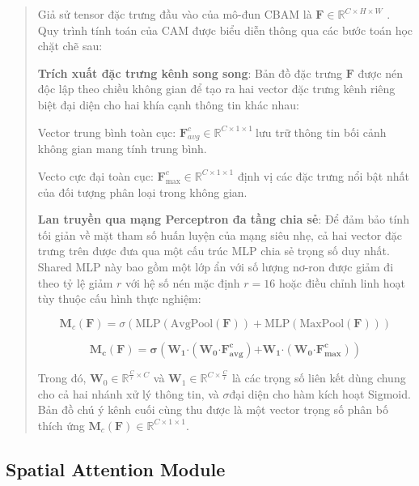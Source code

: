 \documentclass[
  12pt,
  a4paper,
]{report}
\begin{document}
\begin{quote}
Giả sử tensor đặc trưng đầu vào của mô-đun CBAM là
\(\mathbf{F} \in \mathbb{R}^{C \times H \times W}\) . Quy trình tính
toán của CAM được biểu diễn thông qua các bước toán học chặt chẽ sau:

\textbf{Trích xuất đặc trưng kênh song song}: Bản đồ đặc trưng
\(\mathbf{F}\) được nén độc lập theo chiều không gian để tạo ra hai
vector đặc trưng kênh riêng biệt đại diện cho hai khía cạnh thông tin
khác nhau:

Vector trung bình toàn cục:
\(\mathbf{F}_{avg}^{c} \in \mathbb{R}^{C \times 1 \times 1}\ \)lưu trữ
thông tin bối cảnh không gian mang tính trung bình.

Vecto cực đại toàn cục:
\(\mathbf{F}_{\max}^{c} \in \mathbb{R}^{C \times 1 \times 1}\) định vị
các đặc trưng nổi bật nhất của đối tượng phân loại trong không gian.

\textbf{Lan truyền qua mạng Perceptron đa tầng chia sẻ}: Để đảm bảo tính
tối giản về mặt tham số huấn luyện của mạng siêu nhẹ, cả hai vector đặc
trưng trên được đưa qua một cấu trúc MLP chia sẻ trọng số duy nhất.
Shared MLP này bao gồm một lớp ẩn với số lượng nơ-ron được giảm đi theo
tỷ lệ giảm \(r\) với hệ số nén mặc định \(r = 16\) hoặc điều chỉnh linh
hoạt tùy thuộc cấu hình thực nghiệm:

\[\mathbf{M}_{c}\left( \mathbf{F} \right) = \sigma\left( \text{MLP}\left( \text{AvgPool}\left( \mathbf{F} \right) \right) + \text{MLP}\left( \text{MaxPool}\left( \mathbf{F} \right) \right) \right)\]

\[\mathbf{M}_{\mathbf{c}}\left( \mathbf{F} \right)\mathbf{= \sigma}\left( \mathbf{W}_{\mathbf{1}}\mathbf{\cdot}\left( \mathbf{W}_{\mathbf{0}}\mathbf{\cdot}\mathbf{F}_{\mathbf{avg}}^{\mathbf{c}} \right)\mathbf{+}\mathbf{W}_{\mathbf{1}}\mathbf{\cdot}\left( \mathbf{W}_{\mathbf{0}}\mathbf{\cdot}\mathbf{F}_{\mathbf{\max}}^{\mathbf{c}} \right) \right)\]

Trong đó, \(\mathbf{W}_{0} \in \mathbb{R}^{\frac{C}{r} \times C}\) và
\(\mathbf{W}_{1} \in \mathbb{R}^{C \times \frac{C}{r}}\) là các trọng số
liên kết dùng chung cho cả hai nhánh xử lý thông tin, và \(\sigma\)đại
diện cho hàm kích hoạt Sigmoid. Bản đồ chú ý kênh cuối cùng thu được là
một vector trọng số phân bố thích ứng
\(\mathbf{M}_{c}\left( \mathbf{F} \right) \in \mathbb{R}^{C \times 1 \times 1}\).
\end{quote}

\subsection{Spatial Attention Module}\label{spatial-attention-module}
\end{document}
